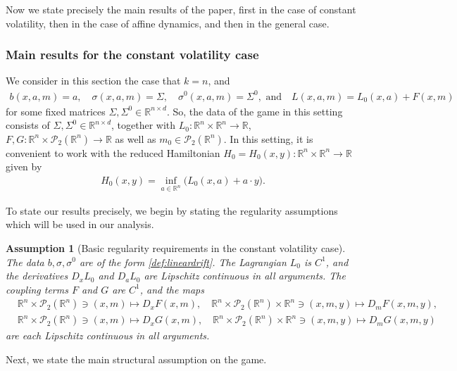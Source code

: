 \documentclass[11pt,reqno]{amsart}
\numberwithin{equation}{section}
\newtheorem{assumption}[theorem]{Assumption}
\theoremstyle{definition}
\def\R{{\mathbb R}}
\newcommand{\sP}{\mathcal{P}}
\newcommand{\spt}{\mathcal{P}_2(\R^n)}
\def \R{\mathbb{R}}
\begin{document}
Now we state precisely the main results of the paper, first in the case of constant volatility, then in the case of affine dynamics, and then in the general case.

\subsubsection{Main results for the constant volatility case} 
\label{subsec:driftcontrol}

We consider in this section the case that $k = n$, and
\begin{align} \label{def:lineardrift}
  b(x,a,m) = a,\quad \sigma(x,a,m)= \Sigma, \quad \sigma^0(x,a,m) =\Sigma^0, \text{ and} \quad L(x,a,m) = L_0(x,a) + F(x,m) %
\end{align}
for some fixed matrices $\Sigma, \Sigma^0\in \R^{n\times d}$. So, the data of the game in this setting consists of $\Sigma, \Sigma^0 \in \R^{n \times d}$, together with $L_0 : \R^n \times \R^n \to \R$, $F,G : \R^n \times \spt \to \R$ as well as $m_0 \in \sP_2(\R^n)$. In this setting, it is convenient to work with the reduced Hamiltonian $H_0 = H_0(x,y) : \R^n \times \R^n \to \R$ given by 
\begin{align} \label{def:reducedham}
H_0(x,y) = \inf_{a \in \R^n} \big( L_0(x,a) + a \cdot y\big).
\end{align}

To state our results precisely, we begin by stating the regularity assumptions which will be used in our analysis.

\begin{assumption}[Basic regularity requirements in the constant volatility case] \label{assump:driftcontrolreg}
The data $b, \sigma, \sigma^0$ are of the form \eqref{def:lineardrift}. The Lagrangian $L_0$ is $C^1$, and the derivatives $D_xL_0$ and $D_a L_0$ are Lipschitz continuous in all arguments. The coupling terms $F$ and $G$ are $C^1$, and the maps 
\begin{align*}
&\R^n \times \spt \ni (x,m) \mapsto D_x F(x,m), \quad \R^n \times \spt \times \R^n \ni (x,m,y) \mapsto D_m F(x,m,y), \\
&\R^n \times \spt \ni (x,m) \mapsto D_x G(x,m), \quad \R^n \times \spt \times \R^n \ni (x,m,y) \mapsto D_m G(x,m,y)
\end{align*}
are each Lipschitz continuous in all arguments.
\end{assumption}


Next, we state the main structural assumption on the game. 
\end{document}
